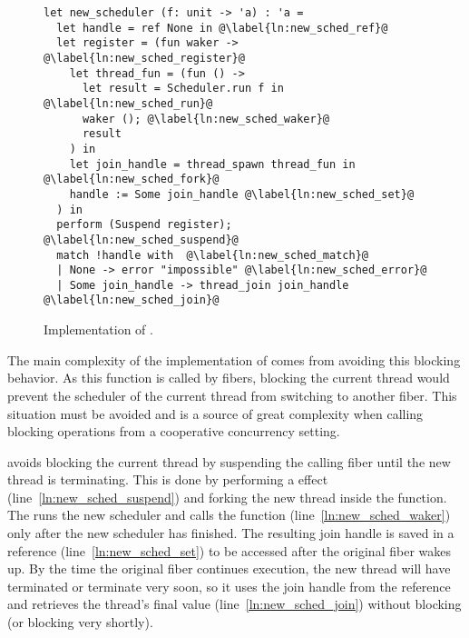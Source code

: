 \begin{figure}[ht]
  \begin{verbatim}
let new_scheduler (f: unit -> 'a) : 'a = 
  let handle = ref None in @\label{ln:new_sched_ref}@
  let register = (fun waker -> @\label{ln:new_sched_register}@ 
    let thread_fun = (fun () ->
      let result = Scheduler.run f in @\label{ln:new_sched_run}@ 
      waker (); @\label{ln:new_sched_waker}@
      result
    ) in
    let join_handle = thread_spawn thread_fun in @\label{ln:new_sched_fork}@
    handle := Some join_handle @\label{ln:new_sched_set}@
  ) in
  perform (Suspend register); @\label{ln:new_sched_suspend}@
  match !handle with  @\label{ln:new_sched_match}@
  | None -> error "impossible" @\label{ln:new_sched_error}@
  | Some join_handle -> thread_join join_handle @\label{ln:new_sched_join}@
\end{verbatim}
  \caption{Implementation of .}
  \label{fig:dm-impl}
\end{figure}

The main complexity of the implementation of  comes from avoiding this blocking behavior.
As this function is called by fibers, blocking the current thread would prevent the scheduler of the current thread from switching to another fiber.
This situation must be avoided and is a source of great complexity when calling blocking operations from a cooperative concurrency setting.

 avoids blocking the current thread by suspending the calling fiber until the new thread is terminating.
This is done by performing a \esuspend{} effect (line~\ref{ln:new_sched_suspend}) and forking the new thread inside the  function.
The  runs the new scheduler and calls the  function (line~\ref{ln:new_sched_waker}) only after the new scheduler has finished.
The resulting join handle is saved in a reference (line~\ref{ln:new_sched_set}) to be accessed after the original fiber wakes up.
By the time the original fiber continues execution, the new thread will have terminated or terminate very soon, so it uses the join handle from the reference and retrieves the thread's final value (line~\ref{ln:new_sched_join}) without blocking (or blocking very shortly).

